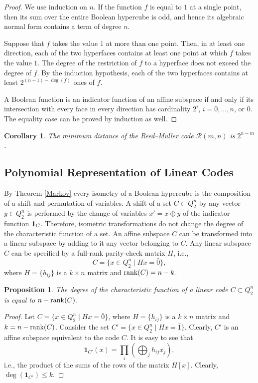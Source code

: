 \documentclass[11pt]{article}
\newtheorem{claim}{Proposition}[section]
\newtheorem{corollary}{Corollary}[section]
\theoremstyle{definition}
\newcommand{\rank}{{\rm rank}}
\begin{document}
{{{\begin{proof}
We use induction on $n$. If the function $f$ is equal to $1$ at a
single point, then its sum over the entire Boolean hypercube is odd, and
hence its algebraic normal form contains a term of degree $n$.

Suppose that $f$ takes the value $1$ at more than one point. Then,
in at least one direction, each of the two hyperfaces contains at
least one point at which $f$ takes the value $1$. The degree of the
restriction of $f$ to a hyperface does not exceed the degree of $f$.
By the induction hypothesis, each of the two hyperfaces contains at
least
$2^{(n-1)-\deg(f)}$
ones of $f$.

A Boolean function is an indicator function of an affine subspace  if and only if its intersection with
every face in every direction has cardinality $2^i$, $i=0,\dots,n$, or $0$. The
equality case can be proved by induction as well.
\end{proof}

\begin{corollary}
The minimum distance of the Reed--Muller code
$\mathcal{R}(m,n)$ is
$2^{n-m}$.
\end{corollary}


\subsection{Polynomial Representation of  Linear Codes}


By Theorem \ref{Markov} every isometry of a Boolean hypercube is the composition of a shift  and  permutation of variables.
A shift of a set $C\subset Q_2^n$ by any vector $y\in Q_2^n$
is performed by the change of variables $x'=x\oplus y$ of the indicator function ${\bf 1}_C$.
Therefore, isometric transformations do not change the degree of the
characteristic function of a set. An affine subspace $C$ can be transformed
into a linear subspace by adding to it any vector belonging to $C$.
Any linear subspace $C$ can be specified by a full-rank parity-check
matrix $H$, i.e.,
\[
C=\{x\in Q_2^n\mid Hx=\bar{0}\},
\]
where
$H=\{h_{ij}\}$ is a $k\times n$ matrix and
$\rank(C)=n-k$. 

\begin{claim}
The degree of the characteristic function of a linear code
$C\subset Q_2^n$ is equal to $n-\rank(C)$.
\end{claim}

\begin{proof}
Let
$
C=\{x\in Q_2^n\mid Hx=\bar{0}\}$,
where $H=\{h_{ij}\}$ is a $k\times n$ matrix and
$k=n-\rank(C)$. Consider the set
$C'=\{x\in Q_2^n\mid Hx=\bar{1}\}$.
Clearly, $C'$ is an affine subspace equivalent to the code $C$.
It is easy to see that
\[
{\mathbf 1}_{C'}(x)=\prod_i\left(\bigoplus_j h_{ij}x_j\right),
\]
i.e., the product of the sums of the rows of the matrix $H[x]$.
Clearly, $\deg({\mathbf 1}_{C'})\leq k$.


\end{proof}}}}
\end{document}
